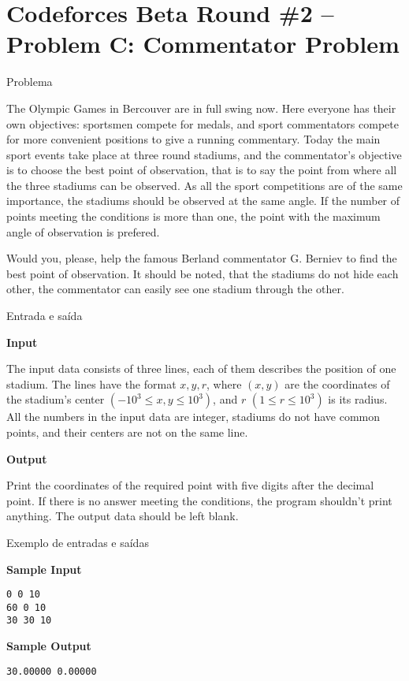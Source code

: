 \section{Codeforces Beta Round \#2 -- Problem C: Commentator Problem}

\begin{frame}[fragile]{Problema}

The Olympic Games in Bercouver are in full swing now. Here everyone has their own objectives: sportsmen compete for medals, and sport commentators compete for more convenient positions to give a running commentary. Today the main sport events take place at three round stadiums, and the commentator's objective is to choose the best point of observation, that is to say the point from where all the three stadiums can be observed. As all the sport competitions are of the same importance, the stadiums should be observed at the same angle. If the number of points meeting the conditions is more than one, the point with the maximum angle of observation is prefered.

Would you, please, help the famous Berland commentator G. Berniev to find the best point of observation. It should be noted, that the stadiums do not hide each other, the commentator can easily see one stadium through the other.

\end{frame}

\begin{frame}[fragile]{Entrada e saída}

\textbf{Input}

The input data consists of three lines, each of them describes the position of one stadium. The lines have the format $x, y, r$, where $(x, y)$ are the coordinates of the stadium's center 
$(-10^3\leq x, y\leq 10^3)$, and $r$ $(1\leq r\leq 10^3)$ is its radius. All the numbers in the input data are integer, stadiums do not have common points, and their centers are not on the same line.

\textbf{Output}

Print the coordinates of the required point with five digits after the decimal point. If there is no answer meeting the conditions, the program shouldn't print anything. The output data should be left blank.

\end{frame}

\begin{frame}[fragile]{Exemplo de entradas e saídas}

\begin{minipage}[t]{0.5\textwidth}
\textbf{Sample Input}
\begin{verbatim}
0 0 10
60 0 10
30 30 10
\end{verbatim}
\end{minipage}
\begin{minipage}[t]{0.45\textwidth}
\textbf{Sample Output}
\begin{verbatim}
30.00000 0.00000
\end{verbatim}
\end{minipage}
\end{frame}

